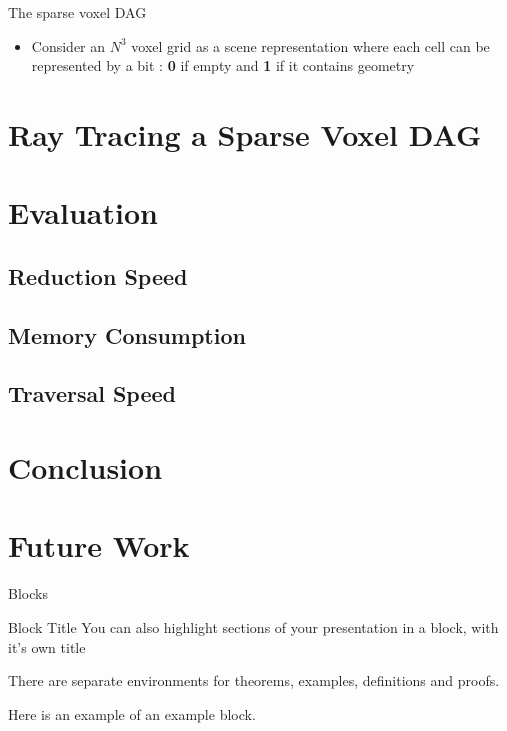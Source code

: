 \documentclass{beamer}
\begin{document}
\begin{frame}{The sparse voxel DAG}
	\begin{itemize}
		\item{
		Consider an $N^3$ voxel grid as a scene representation where each cell can be represented by a bit : \textbf{0} if empty and \textbf{1} if it contains geometry
		}
		
	\end{itemize}
\end{frame}

\section{Ray Tracing a Sparse Voxel DAG}

\section{Evaluation}
\subsection{Reduction Speed}
\subsection{Memory Consumption}
\subsection{Traversal Speed}

\section{Conclusion}
\section{Future Work}

\begin{frame}{Blocks}
\begin{block}{Block Title}
You can also highlight sections of your presentation in a block, with it's own title
\end{block}
\begin{theorem}
There are separate environments for theorems, examples, definitions and proofs.
\end{theorem}
\begin{example}
Here is an example of an example block.
\end{example}
\end{frame}
\end{document}
